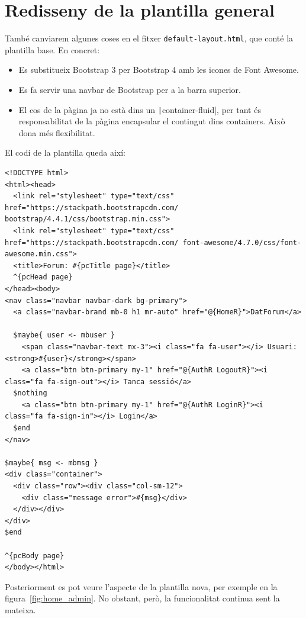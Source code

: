 \documentclass[catalan, a4paper]{scrartcl}
\begin{document}
\section{Redisseny de la plantilla general}

També canviarem algunes coses en el fitxer \texttt{default-layout.html},
que conté la plantilla base. En concret:

\begin{itemize}
\item Es substitueix Bootstrap 3 per Bootstrap 4 amb les icones de Font Awesome.
\item Es fa servir una navbar de Bootstrap per a la barra superior.
\item El cos de la pàgina ja no està dins un \texttt|container-fluid|,
per tant és responsabilitat de la pàgina encapsular el contingut dins containers.
Això dona més flexibilitat.
\end{itemize}

El codi de la plantilla queda així:

\begin{verbatim}
<!DOCTYPE html>
<html><head>
  <link rel="stylesheet" type="text/css" href="https://stackpath.bootstrapcdn.com/ bootstrap/4.4.1/css/bootstrap.min.css">
  <link rel="stylesheet" type="text/css" href="https://stackpath.bootstrapcdn.com/ font-awesome/4.7.0/css/font-awesome.min.css">
  <title>Forum: #{pcTitle page}</title>
  ^{pcHead page}
</head><body>
<nav class="navbar navbar-dark bg-primary">
  <a class="navbar-brand mb-0 h1 mr-auto" href="@{HomeR}">DatForum</a>

  $maybe{ user <- mbuser }
    <span class="navbar-text mx-3"><i class="fa fa-user"></i> Usuari: <strong>#{user}</strong></span>
    <a class="btn btn-primary my-1" href="@{AuthR LogoutR}"><i class="fa fa-sign-out"></i> Tanca sessió</a>
  $nothing
    <a class="btn btn-primary my-1" href="@{AuthR LoginR}"><i class="fa fa-sign-in"></i> Login</a>
  $end
</nav>

$maybe{ msg <- mbmsg }
<div class="container">
  <div class="row"><div class="col-sm-12">
    <div class="message error">#{msg}</div>
  </div></div>
</div>
$end

^{pcBody page}
</body></html>
\end{verbatim}

Posteriorment es pot veure l'aspecte de la plantilla nova, per exemple
en la figura~\ref{fig:home_admin}. No obstant, però, la funcionalitat
continua sent la mateixa.
\end{document}
